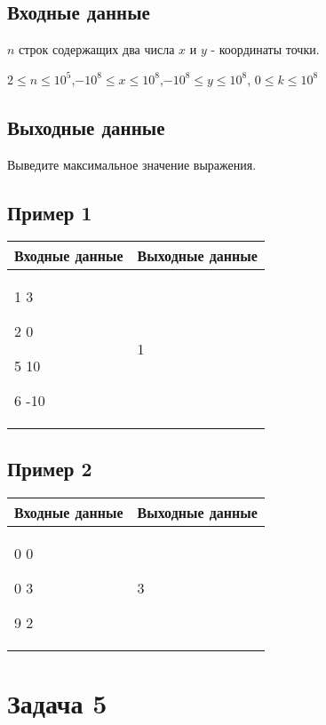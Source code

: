 \documentclass[a4]{article}
\begin{document}
\subsection*{Входные данные}
\label{sec:orgeb4908d}
$n$ строк содержащих два числа $x$ и $y$ - координаты точки.

$2\leq n \leq 10^5$,$-10^8 \leq x \leq 10^8$,$-10^8 \leq y \leq 10^8$, $0\leq k \leq 10^8$
\subsection*{Выходные данные}
\label{sec:orged795e8}
Выведите максимальное значение выражения.
\subsection*{Пример 1}
\label{sec:org6a26c04}

\begin{table}[H]
\begin{center}
\begin{tabular}{|m{4cm}|m{4cm}|}
\hline
Входные данные & Выходные данные \\ \hline
1 3

2 0

5 10

6 -10
&
1 
\\ \hline
\end{tabular}
\end{center}
\end{table}

\subsection*{Пример 2}
\label{sec:orge96f7c4}

\begin{table}[H]
\begin{center}
\begin{tabular}{|m{4cm}|m{4cm}|}
\hline
Входные данные & Выходные данные \\ \hline
0 0 

0 3 

9 2
&
3
\\ \hline
\end{tabular}
\end{center}
\end{table}

\pagebreak

\section*{Задача 5}
\label{sec:orgb62fe60}
\end{document}
